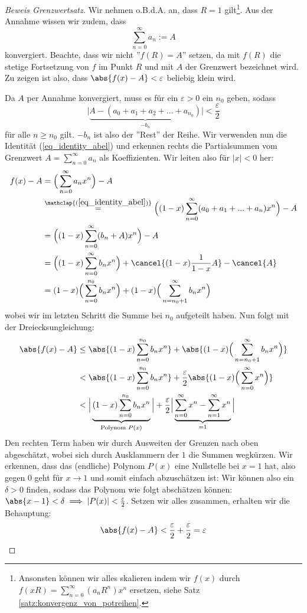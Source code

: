 \begin{proof}[Beweis Grenzwertsatz]
Wir nehmen o.B.d.A. an, dass $R = 1$ gilt\footnote{Ansonsten können wir alles skalieren indem wir $f(x)$ durch $f(xR) = \sum_{n=0}^\infty(a_nR^n)x^n$ ersetzen, siehe Satz \ref{satz:konvergenz_von_potreihen}.}. Aus der Annahme wissen wir zudem, dass
$$\sum_{n=0}^\infty a_n := A$$
konvergiert. Beachte, dass wir nicht ''$f(R) = A$'' setzen, da mit $f(R)$ die stetige Fortsetzung von $f$ im Punkt $R$ und mit $A$ der Grenzwert bezeichnet wird. Zu zeigen ist also, dass $\abs{f(x) - A} < \varepsilon$ beliebig klein wird.

Da $A$ per Annahme konvergiert, muss es für ein $\varepsilon > 0$ ein $n_0$ geben, sodass 
$$\Big|\underbrace{A-(a_0+a_1+a_2+...+a_{n_0})}_{-b_n}\Big| < \frac{\varepsilon}{2}$$
für alle $n \geq n_0$ gilt. $-b_n$ ist also der ''Rest'' der Reihe. Wir verwenden nun die Identität (\ref{eq_identity_abel}) und erkennen rechts die Partialsummen vom Grenzwert $A = \sum_{n=0}^\infty a_n$ als Koeffizienten. Wir leiten also für $|x| < 0$ her:
\begin{align*}
    f(x) - A &= \Big(\sum_{n=0}^\infty a_n x^n\Big) - A\\
        &\stackrel{\mathclap{\mathrm{(\ref{eq_identity_abel})}}}{=}\Big( (1-x) \sum_{n=0}^\infty (a_0 + a_1 + ... + a_n) x^n\Big) - A\\
        &=\Big( (1-x) \sum_{n=0}^\infty (b_n+A) x^n\Big) - A\\
        &=\Big( (1-x) \sum_{n=0}^\infty b_n x^n\Big) + \cancel{(1-x)\frac{1}{1-x}A} - \cancel{A}\\
        &= (1-x) \Big(\sum_{n=0}^{n_0} b_n x^n\Big) +  (1-x) \Big(\sum_{n=n_0+1}^\infty b_n x^n\Big)
\end{align*}
wobei wir im letzten Schritt die Summe bei $n_0$ aufgeteilt haben. Nun folgt mit der Dreiecksungleichung:
\begin{align*}
\abs{f(x)-A}&\leq\abs{(1-x) \sum_{n=0}^{n_0} b_n x^n} + \abs{(1-x)  \Big(\sum_{n=n_0+1}^\infty b_n x^n\Big)}\\
        &<\abs{(1-x) \sum_{n=0}^{n_0} b_n x^n} + \frac{\varepsilon}{2}\abs{(1-x) \Big(\sum_{n=0}^\infty x^n\Big)}\\
        &<\Big|\underbrace{(1-x) \sum_{n=0}^{n_0} b_n x^n}_{\text{Polynom }P(x)}\Big| + \frac{\varepsilon}{2}\Big|\underbrace{\sum_{n=0}^\infty x^n - \sum_{n=1}^\infty x^n}_{= 1}\Big|
\end{align*}
Den rechten Term haben wir durch Ausweiten der Grenzen nach oben abgeschätzt, wobei sich durch Ausklammern der $1$ die Summen wegkürzen. Wir erkennen, dass das (endliche) Polynom $P(x)$ eine Nullstelle bei $x=1$ hat, also gegen $0$ geht für $x \to 1$ und somit einfach abzuschätzen ist: Wir können also ein $\delta > 0$ finden, sodass das Polynom wie folgt abschätzen können: $\abs{x-1} < \delta \implies |P(x)| < \frac{\varepsilon}{2}$. Setzen wir alles zusammen, erhalten wir die Behauptung:
$$\abs{f(x)-A}<\frac{\varepsilon}{2} + \frac{\varepsilon}{2} = \varepsilon$$
\end{proof}

